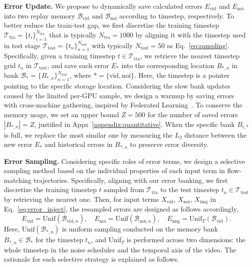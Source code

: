 \documentclass{article} %
\newcommand\vid{\mathrm{vid}}
\newcommand\noi{\mathrm{noi}}
\newcommand\img{\mathrm{img}}
\newcommand{\err}{E}
\newcommand{\bank}{\mathcal{B}}
\newcommand{\samp}{\mathrm{Unif}}
\begin{document}
\noindent\textbf{Error Update.} We propose to dynamically save calculated errors $\err_\vid$ and $\err_\noi$ into two replay memory $\bank_\vid$ and $\bank_\noi$ according to timestep, respectively. To better reduce the train-test gap, we first discretize the training timestep $\mathcal{T}_{\mathrm{tra}}=\{t_i\}_{i=1}^{N_{\mathrm{tra}}}$ that is typically $N_{\mathrm{tra}}=1000$ by aligning it with the timestep used in test stage $\mathcal{T}_{\mathrm{test}}=\{t_n\}_{n=1}^{N_{\mathrm{test}}}$ with typically $N_{\mathrm{test}}=50$ as Eq.~\ref{eq:sampling}. Specifically, given a training timestep $t\in\mathcal{T}_{\mathrm{tra}}$, we retrieve the nearest timestep grid $t_n$ in $\mathcal{T}_{\mathrm{test}}$, and save each error $E_{\ast}$ into the corresponding location $B_{\ast,n}$ in bank $\bank_{\ast}=\{B_{\ast,n}\}_{n=1}^{N_{\mathrm{test}}}$, where $\ast=\{\vid,\noi\}$. Here, the timestep is a pointer pointing to the specific storage location. 
Considering the slow bank updates caused by the limited per-GPU sample, we design a warmup by saving errors with cross-machine gathering, inspired by Federated Learning~\citep{mcmahan2017communication}. To conserve the memory usage, we set an upper bound $Z=500$ for the number of saved errors $|B_{\ast,n}|=Z$, justified in Appx~\ref{appendix:quantitative}. When the specific bank $B_{i,\ast}$ is full, we replace the most similar one by measuring the $L_2$ distance between the new error $E_{\ast}$ and historical errors in $B_{\ast,n}$ to preserve error diversity.

\noindent\textbf{Error Sampling.} Considering specific roles of error terms, we design a selective sampling method based on the individual properties of each input term in flow-matching trajectories. Specifically, aligning with our error banking, we first discretize the training timestep $t$ sampled from $\mathcal{T}_{\mathrm{tra}}$ to the test timestep $t_n \in \mathcal{T}_{\mathrm{test}}$ by retrieving the nearest one. Then, for input terms $X_\vid$, $X_\noi$, $X_\img$ in Eq.~\ref{eq:error_inject}, the resampled errors are designed as follows accordingly,
\begin{equation}\label{eq:error_sampling}
\err_\vid = \samp(\bank_{\vid,n}), \quad \err_\noi = \samp(\bank_{\noi,n}), \quad \err_\img = \samp_{T}(\bank_\vid).
\end{equation}
Here, $\samp(\bank_{\ast,n})$ is uniform sampling conducted on the memory bank $B_{\ast,n} \in \bank_{\ast}$ for the timestep $t_n$, and $\samp_{T}$ is performed across two dimensions: the whole timestep in the noise scheduler and the temporal axis of the video. The rationale for each selective strategy is explained as follows. 
\end{document}
